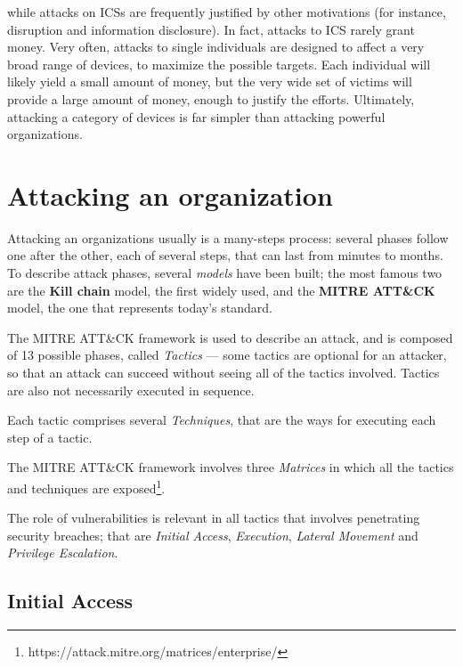 \documentclass[10pt]{extreport}
\begin{document}
while attacks on ICSs are frequently justified by other motivations (for
instance, disruption and information disclosure). In fact, attacks to ICS
rarely grant money. Very often, attacks to single individuals are designed to
affect a very broad range of devices, to maximize the possible targets. Each
individual will likely yield a small amount of money, but the very wide set of
victims will provide a large amount of money, enough to justify the efforts.
Ultimately, attacking a category of devices is far simpler than attacking
powerful organizations.






\section{Attacking an organization}

Attacking an organizations usually is a many\--steps process: several phases
follow one after the other, each of several steps, that can last from minutes
to months. To describe attack phases, several \emph{models} have been built;
the most famous two are the \textbf{Kill chain} model, the first widely used,
and the \textbf{MITRE ATT\&CK} model, the one that represents today's standard.

The MITRE ATT\&CK framework is used to describe an attack, and is composed of
13 possible phases, called \emph{Tactics} --- some tactics are optional for an
attacker, so that an attack can succeed without seeing all of the tactics
involved. Tactics are also not necessarily executed in sequence.

Each tactic comprises several \emph{Techniques}, that are the ways for
executing each step of a tactic.

The MITRE ATT\&CK framework involves three \emph{Matrices} in which all the
tactics and techniques are
exposed\footnote{https://attack.mitre.org/matrices/enterprise/}.

The role of vulnerabilities is relevant in all tactics that involves
penetrating security breaches; that are \emph{Initial Access},
\emph{Execution}, \emph{Lateral Movement} and \emph{Privilege Escalation}.

\subsection{Initial Access}
\end{document}
